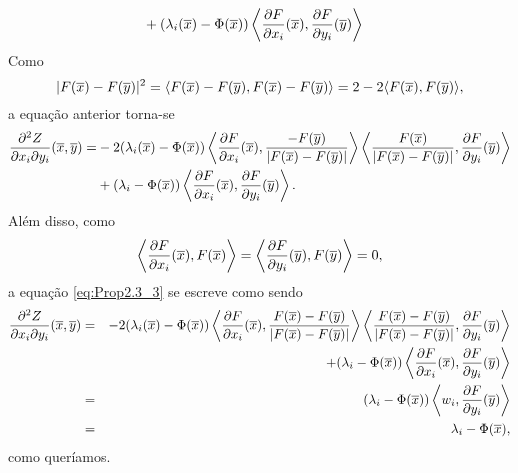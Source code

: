\begin{demonstracao}
\begin{eqnarray*}
\begin{aligned}
			&+ 
			(\lambda_i(\overline{x}) - \Phi(\overline{x})) \left\langle \frac{\partial F}{\partial x_i}(\overline{x}), \frac{\partial F}{\partial y_i}(\overline{y}) \right\rangle
		\end{aligned}
	\end{eqnarray*}	
	Como 
	\[
	|F(\overline{x}) - F(\overline{y})|^2 = \langle F(\overline{x}) - F(\overline{y}), F(\overline{x}) - F(\overline{y}) \rangle = 
	2 - 2 \langle F(\overline{x}), F(\overline{y}) \rangle,
	\]
	a equa\c c\~ao anterior torna-se
	\begin{eqnarray} \label{eq:Prop2.3_3}
	\begin{aligned}
	\frac{\partial^2 Z}{\partial x_i \partial y_i}(\overline{x},\overline{y}) = & 
	-2 (\lambda_i(\overline{x}) - \Phi(\overline{x})) \left\langle \frac{\partial F}{\partial x_i}(\overline{x}), 
	\frac{-F(\overline{y})}{|F(\overline{x}) - F(\overline{y})|} \right\rangle \left\langle \frac{F(\overline{x})}{|F(\overline{x}) - 
		F(\overline{y})|}, \frac{\partial F}{\partial y_i}(\overline{y}) \right\rangle \\
	& + 
	(\lambda_i - \Phi(\overline{x})) \left\langle \frac{\partial F}{\partial x_i}(\overline{x}), 
	\frac{\partial F}{\partial y_i}(\overline{y}) \right\rangle.
	\end{aligned}
	\end{eqnarray}	
	Al\'em disso, como
	\[
	\left\langle \frac{\partial F}{\partial x_i}(\overline{x}), F(\overline{x}) \right\rangle = 
	\left\langle \frac{\partial F}{\partial y_i}(\overline{y}), F(\overline{y}) \right\rangle = 0,
	\]
	a equação \eqref{eq:Prop2.3_3} se escreve como sendo
	\begin{eqnarray*}
		\frac{\partial^2 Z}{\partial x_i \partial y_i}(\overline{x},\overline{y}) & = &
		-2 (\lambda_i(\overline{x}) - \Phi(\overline{x})) \left\langle \frac{\partial F}{\partial x_i}(\overline{x}), \frac{F(\overline{x}) -F(\overline{y})}{|F(\overline{x}) - F(\overline{y})|} \right\rangle \left\langle 
		\frac{F(\overline{x}) - F(\overline{y})}{|F(\overline{x}) - F(\overline{y})|}, \frac{\partial F}{\partial y_i}(\overline{y}) 
		\right\rangle \\
		&& + 
		(\lambda_i - \Phi(\overline{x})) \left\langle \frac{\partial F}{\partial x_i}(\overline{x}), 
		\frac{\partial F}{\partial y_i}(\overline{y}) \right\rangle \\
		&= &
		(\lambda_i - \Phi(\overline{x})) \left\langle w_i,\frac{\partial F}{\partial y_i}(\overline{y})
		\right\rangle \\
		&= & \lambda_i - \Phi(\overline{x}),
	\end{eqnarray*}	
	como quer\'iamos.
\end{demonstracao}


